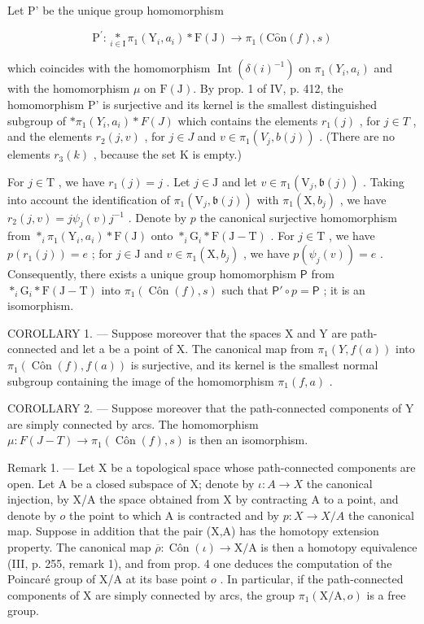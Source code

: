 Let P' be the unique group homomorphism

\[
\mathrm{P} ^ {\prime} \colon \underset {i \in \mathrm{I}} {*} \pi_ {1} (\mathrm{Y} _ {i}, a _ {i}) * \mathrm{F} (\mathrm{J}) \to \pi_ {1} (\mathrm{C} \hat {\mathrm{o}} \mathrm{n} (f), s)
\]

which coincides with the homomorphism \(\operatorname{Int}(\delta(i)^{-1})\) on \(\pi_1(Y_i, a_i)\) and with the homomorphism \(\mu\) on \(\mathrm{F}(\mathrm{J})\). By prop. 1 of IV, p. 412, the homomorphism P' is surjective and its kernel is the smallest distinguished subgroup of \(*\pi_1(Y_i, a_i) * F(J)\) which contains the elements \(r_1(j)\) , for \(j \in T\) , and the elements \(r_{2}(j, v)\) , for \(j \in J\) and \(v \in \pi_{1}(V_{j}, b(j))\) . (There are no elements \(r_{3}(k)\) , because the set K is empty.)

For \(j \in \mathrm{T}\) , we have \(r_1(j) = j\) . Let \(j \in \mathrm{J}\) and let \(v \in \pi_1(\mathrm{V}_j, \mathfrak{b}(j))\) . Taking into account the identification of \(\pi_1(\mathrm{V}_j, \mathfrak{b}(j))\) with \(\pi_1(\mathrm{X}, b_j)\) , we have \(r_2(j, v) = j\psi_j(v)j^{-1}\) . Denote by \(p\) the canonical surjective homomorphism from \(*_{i}\pi_1(\mathrm{Y}_i, a_i) * \mathrm{F}(\mathrm{J})\) onto \(*_{i}\mathrm{G}_{i} * \mathrm{F}(\mathrm{J} - \mathrm{T})\) . For \(j \in \mathrm{T}\) , we have \(p(r_1(j)) = e\) ; for \(j \in \mathrm{J}\) and \(v \in \pi_1(\mathrm{X}, b_j)\) , we have \(p(\psi_j(v)) = e\) . Consequently, there exists a unique group homomorphism \(\mathsf{P}\) from \(*_{i}\mathrm{G}_{i} * \mathrm{F}(\mathrm{J} - \mathrm{T})\) into \(\pi_1(\operatorname{Côn}(f), s)\) such that \(\mathsf{P}' \circ p = \mathsf{P}\) ; it is an isomorphism.

COROLLARY 1. --- Suppose moreover that the spaces X and Y are path-connected and let a be a point of X. The canonical map from \(\pi_1(Y, f(a))\) into \(\pi_1(\operatorname{Côn}(f), f(a))\) is surjective, and its kernel is the smallest normal subgroup containing the image of the homomorphism \(\pi_1(f, a)\) .

COROLLARY 2. --- Suppose moreover that the path-connected components of Y are simply connected by arcs. The homomorphism \(\mu\colon F(J-T)\to\pi_{1}(\operatorname{Côn}(f),s)\) is then an isomorphism.

Remark 1. --- Let X be a topological space whose path-connected components are open. Let A be a closed subspace of X; denote by \(\iota\colon A\to X\) the canonical injection, by X/A the space obtained from X by contracting A to a point, and denote by \(o\) the point to which A is contracted and by \(p\colon X\to X / A\) the canonical map. Suppose in addition that the pair (X,A) has the homotopy extension property. The canonical map \(\overline{\rho}\colon \operatorname{Côn}(\iota)\to \mathrm{X} / \mathrm{A}\) is then a homotopy equivalence (III, p. 255, remark 1), and from prop. 4 one deduces the computation of the Poincaré group of X/A at its base point \(o\) . In particular, if the path-connected components of X are simply connected by arcs, the group \(\pi_1(\mathrm{X / A},o)\) is a free group.
